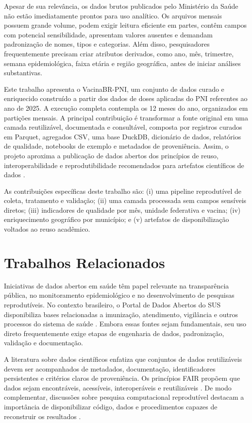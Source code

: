 \documentclass[12pt]{article}
\begin{document}
Apesar de sua relevância, os dados brutos publicados pelo Ministério da Saúde não estão imediatamente prontos para uso analítico. Os arquivos mensais possuem grande volume, podem exigir leitura eficiente em partes, contêm campos com potencial sensibilidade, apresentam valores ausentes e demandam padronização de nomes, tipos e categorias. Além disso, pesquisadores frequentemente precisam criar atributos derivados, como ano, mês, trimestre, semana epidemiológica, faixa etária e região geográfica, antes de iniciar análises substantivas.

Este trabalho apresenta o VacinaBR-PNI, um conjunto de dados curado e enriquecido construído a partir dos dados de doses aplicadas do PNI referentes ao ano de 2025. A execução completa contempla os 12 meses do ano, organizados em partições mensais. A principal contribuição é transformar a fonte original em uma camada reutilizável, documentada e consultável, composta por registros curados em Parquet, agregados CSV, uma base DuckDB, dicionário de dados, relatórios de qualidade, notebooks de exemplo e metadados de proveniência. Assim, o projeto aproxima a publicação de dados abertos dos princípios de reuso, interoperabilidade e reprodutibilidade recomendados para artefatos científicos de dados \cite{wilkinson2016fair,peng2011reproducible}.

As contribuições específicas deste trabalho são: (i) uma pipeline reprodutível de coleta, tratamento e validação; (ii) uma camada processada sem campos sensíveis diretos; (iii) indicadores de qualidade por mês, unidade federativa e vacina; (iv) enriquecimento geográfico por município; e (v) artefatos de disponibilização voltados ao reuso acadêmico.

\section{Trabalhos Relacionados}

Iniciativas de dados abertos em saúde têm papel relevante na transparência pública, no monitoramento epidemiológico e no desenvolvimento de pesquisas reprodutíveis. No contexto brasileiro, o Portal de Dados Abertos do SUS disponibiliza bases relacionadas a imunização, atendimento, vigilância e outros processos do sistema de saúde \cite{datasus_pni_2025}. Embora essas fontes sejam fundamentais, seu uso direto frequentemente exige etapas de engenharia de dados, padronização, validação e documentação.

A literatura sobre dados científicos enfatiza que conjuntos de dados reutilizáveis devem ser acompanhados de metadados, documentação, identificadores persistentes e critérios claros de proveniência. Os princípios FAIR propõem que dados sejam encontráveis, acessíveis, interoperáveis e reutilizáveis \cite{wilkinson2016fair}. De modo complementar, discussões sobre pesquisa computacional reprodutível destacam a importância de disponibilizar código, dados e procedimentos capazes de reconstruir os resultados \cite{peng2011reproducible}.
\end{document}
